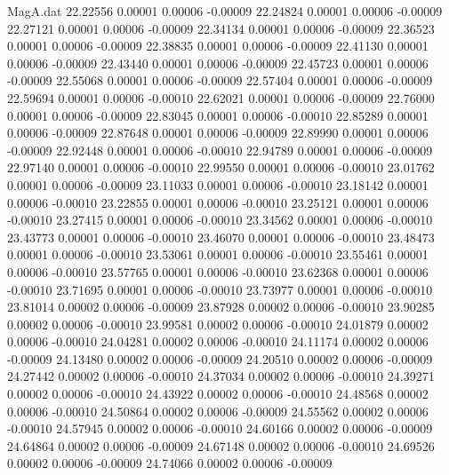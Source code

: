 \begin{filecontents}{MagA.dat}
  22.22556    0.00001    0.00006   -0.00009
  22.24824    0.00001    0.00006   -0.00009
  22.27121    0.00001    0.00006   -0.00009
  22.34134    0.00001    0.00006   -0.00009
  22.36523    0.00001    0.00006   -0.00009
  22.38835    0.00001    0.00006   -0.00009
  22.41130    0.00001    0.00006   -0.00009
  22.43440    0.00001    0.00006   -0.00009
  22.45723    0.00001    0.00006   -0.00009
  22.55068    0.00001    0.00006   -0.00009
  22.57404    0.00001    0.00006   -0.00009
  22.59694    0.00001    0.00006   -0.00010
  22.62021    0.00001    0.00006   -0.00009
  22.76000    0.00001    0.00006   -0.00009
  22.83045    0.00001    0.00006   -0.00010
  22.85289    0.00001    0.00006   -0.00009
  22.87648    0.00001    0.00006   -0.00009
  22.89990    0.00001    0.00006   -0.00009
  22.92448    0.00001    0.00006   -0.00010
  22.94789    0.00001    0.00006   -0.00009
  22.97140    0.00001    0.00006   -0.00010
  22.99550    0.00001    0.00006   -0.00010
  23.01762    0.00001    0.00006   -0.00009
  23.11033    0.00001    0.00006   -0.00010
  23.18142    0.00001    0.00006   -0.00010
  23.22855    0.00001    0.00006   -0.00010
  23.25121    0.00001    0.00006   -0.00010
  23.27415    0.00001    0.00006   -0.00010
  23.34562    0.00001    0.00006   -0.00010
  23.43773    0.00001    0.00006   -0.00010
  23.46070    0.00001    0.00006   -0.00010
  23.48473    0.00001    0.00006   -0.00010
  23.53061    0.00001    0.00006   -0.00010
  23.55461    0.00001    0.00006   -0.00010
  23.57765    0.00001    0.00006   -0.00010
  23.62368    0.00001    0.00006   -0.00010
  23.71695    0.00001    0.00006   -0.00010
  23.73977    0.00001    0.00006   -0.00010
  23.81014    0.00002    0.00006   -0.00009
  23.87928    0.00002    0.00006   -0.00010
  23.90285    0.00002    0.00006   -0.00010
  23.99581    0.00002    0.00006   -0.00010
  24.01879    0.00002    0.00006   -0.00010
  24.04281    0.00002    0.00006   -0.00010
  24.11174    0.00002    0.00006   -0.00009
  24.13480    0.00002    0.00006   -0.00009
  24.20510    0.00002    0.00006   -0.00009
  24.27442    0.00002    0.00006   -0.00010
  24.37034    0.00002    0.00006   -0.00010
  24.39271    0.00002    0.00006   -0.00010
  24.43922    0.00002    0.00006   -0.00010
  24.48568    0.00002    0.00006   -0.00010
  24.50864    0.00002    0.00006   -0.00009
  24.55562    0.00002    0.00006   -0.00010
  24.57945    0.00002    0.00006   -0.00010
  24.60166    0.00002    0.00006   -0.00009
  24.64864    0.00002    0.00006   -0.00009
  24.67148    0.00002    0.00006   -0.00010
  24.69526    0.00002    0.00006   -0.00009
  24.74066    0.00002    0.00006   -0.00009

\end{filecontents}
